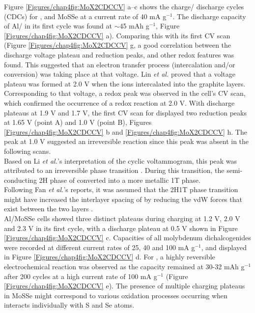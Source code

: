 Figure \ref{Figures/chap4fig:MoX2CDCCV} a--c shows the charge/ discharge cycles (CDCs) for ,  and MoSSe at a current rate of 40 mA g$^{-1}$. The discharge capacity of Al/ in its first cycle was found at $\sim$45 mAh g$^{-1}$, Figure \ref{Figures/chap4fig:MoX2CDCCV} a). Comparing this with its first CV scan (Figure \ref{Figures/chap4fig:MoX2CDCCV} g, a good correlation between the discharge voltage plateau and reduction peaks, and other redox features was found. This suggested that an electron transfer process (intercalation and/or conversion) was taking place at that voltage. Lin \textit{et al.} proved that a voltage plateau was formed at 2.0 V when the  ions intercalated into the graphite layers. Corresponding to that voltage, a redox peak was observed in the cell's CV scan, which confirmed the occurrence of a redox reaction at 2.0 V. With discharge plateaus at 1.9 V and 1.7 V, the first CV scan for  displayed two reduction peaks at 1.65 V (point A) and 1.0 V (point B), Figures \ref{Figures/chap4fig:MoX2CDCCV} b and \ref{Figures/chap4fig:MoX2CDCCV} h. The peak at 1.0 V suggested an irreversible reaction since this peak was absent in the following scans. \\
Based on Li \textit{et al.}'s interpretation of the cyclic voltammogram, this peak was attributed to an irreversible phase transition \cite{li_enhancing_2015}. During this transition, the semi-conducting 2H phase of  converted into a more metallic 1T phase. \\
Following Fan \textit{et al.}'s reports, it was assumed that the 2H\ce{->}1T phase transition might have increased the interlayer spacing of  by reducing the vdW forces that exist between the two layers \cite{fan_hybrid_2017}. \\
Al/MoSSe cells showed three distinct plateaus during charging at 1.2 V, 2.0 V and 2.3 V in its first cycle, with a discharge plateau at 0.5 V shown in Figure \ref{Figures/chap4fig:MoX2CDCCV} c. Capacities of all molybdenum dichalcogenides were recorded at different current rates of 25, 40 and 100 mA g$^{-1}$, and displayed in Figure \ref{Figures/chap4fig:MoX2CDCCV} d. For , a highly reversible electrochemical reaction was observed as the capacity remained at 30-32 mAh g$^{-1}$ after 200 cycles at a high current rate of 100 mA g$^{-1}$ (Figure \ref{Figures/chap4fig:MoX2CDCCV} e). The presence of multiple charging plateaus in MoSSe might correspond to various oxidation processes occurring when  interacts individually with S and Se atoms. \\

